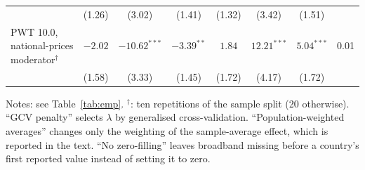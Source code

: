 \documentclass[preprint,12pt,authoryear]{elsarticle}
\begin{document}
\begin{table}[!p]
\begin{threeparttable}
\begin{tabular}{lccccccc}
 & (1.26) & (3.02) & (1.41) & (1.32) & (3.42) & (1.51) & \\
\quad PWT 10.0, national-prices moderator$^{\dagger}$ & $-2.02$ & $-10.62^{***}$ & $-3.39^{**}$ & $1.84$ & $12.21^{***}$ & $5.04^{***}$ & 0.01\\
 & (1.58) & (3.33) & (1.45) & (1.72) & (4.17) & (1.72) & \\
\bottomrule
\end{tabular}
\begin{tablenotes}\scriptsize
\item Notes: see Table~\ref{tab:emp}. $^{\dagger}$: ten repetitions of the sample split (20 otherwise). ``GCV penalty'' selects $\lambda$ by generalised cross-validation. ``Population-weighted averages'' changes only the weighting of the sample-average effect, which is reported in the text. ``No zero-filling'' leaves broadband missing before a country's first reported value instead of setting it to zero.
\end{tablenotes}
\end{threeparttable}
\end{table}
\end{document}
